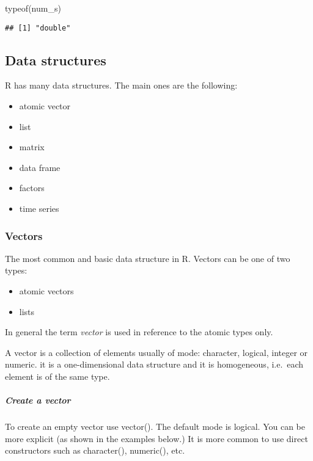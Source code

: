 \documentclass[
]{article}
\newenvironment{Shaded}{\begin{snugshade}}{\end{snugshade}}
\newcommand{\FunctionTok}[1]{\textcolor[rgb]{0.00,0.00,0.00}{#1}}
\newcommand{\NormalTok}[1]{#1}
\providecommand{\tightlist}{%
  \setlength{\itemsep}{0pt}\setlength{\parskip}{0pt}}
\begin{document}
\begin{Shaded}
\begin{Highlighting}[]
\FunctionTok{typeof}\NormalTok{(num\_s)}
\end{Highlighting}
\end{Shaded}

\begin{verbatim}
## [1] "double"
\end{verbatim}

\hypertarget{data-structures}{%
\subsection{Data structures}\label{data-structures}}

R has many data structures. The main ones are the following:

\begin{itemize}
\tightlist
\item
  atomic vector
\item
  list
\item
  matrix
\item
  data frame
\item
  factors
\item
  time series
\end{itemize}

\hypertarget{vectors}{%
\subsubsection{Vectors}\label{vectors}}

The most common and basic data structure in R. Vectors can be one of two
types:

\begin{itemize}
\tightlist
\item
  atomic vectors\\
\item
  lists
\end{itemize}

In general the term \emph{vector} is used in reference to the atomic
types only.

A vector is a collection of elements usually of mode: character,
logical, integer or numeric. it is a one-dimensional data structure and
it is homogeneous, i.e.~each element is of the same type.

\hypertarget{create-a-vector}{%
\subparagraph{Create a vector}\label{create-a-vector}}

To create an empty vector use vector(). The default mode is logical. You
can be more explicit (as shown in the examples below.) It is more common
to use direct constructors such as character(), numeric(), etc.
\end{document}

